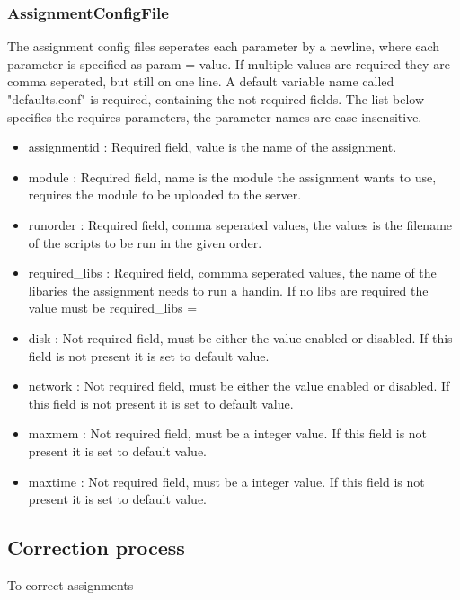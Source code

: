 \subsubsection{AssignmentConfigFile}
\label{sec:assignment}
The assignment config files seperates each parameter by a newline, where each parameter is specified as param = value. If multiple values are required they are comma seperated, but still on one line. A default variable name called "defaults.conf" is required, containing the not required fields.
The list below specifies the requires parameters, the parameter names are case insensitive.
\begin{itemize}
    \item assignmentid : Required field, value is the name of the assignment.
    \item module : Required field, name is the module the assignment wants to use, requires the module to be uploaded to the server.
    \item runorder : Required field, comma seperated values, the values is the filename of the scripts to be run in the given order.
    \item required\_libs : Required field, commma seperated values, the name of the libaries the assignment needs to run a handin. If no libs are required the value must be required\_libs =
    \item disk : Not required field, must be either the value enabled or disabled. If this field is not present it is set to default value.
    \item network : Not required field, must be either the value enabled or disabled. If this field is not present it is set to default value.
    \item maxmem : Not required field, must be a integer value. If this field is not present it is set to default value.
    \item maxtime : Not required field, must be a integer value. If this field is not present it is set to default value.
\end{itemize}



\subsection{Correction process}
To correct assignments 

